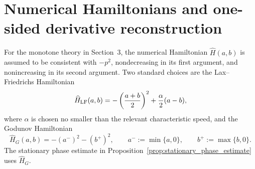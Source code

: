 \documentclass[11pt]{article}
\begin{document}
\appendix

\section{Numerical Hamiltonians and one-sided derivative reconstruction}\label{app:hamiltonian_weno}

For the monotone theory in Section~3, the numerical Hamiltonian \(\widehat H(a,b)\) is assumed to be consistent with \(-p^2\), nondecreasing in its first argument, and nonincreasing in its second argument.  Two standard choices are the Lax--Friedrichs Hamiltonian
\begin{equation}\label{eq:app_LF_H_new}
    \widehat H_{\rm LF}(a,b)
    =-\left(\frac{a+b}{2}\right)^2+\frac{\alpha}{2}(a-b),
\end{equation}
where \(\alpha\) is chosen no smaller than the relevant characteristic speed, and the Godunov Hamiltonian
\begin{equation}\label{eq:app_Godunov_H_new}
    \widehat H_G(a,b)=-(a^-)^2-(b^+)^2,
    \qquad
    a^-:=\min\{a,0\},
    \qquad
    b^+:=\max\{b,0\}.
\end{equation}
The stationary phase estimate in Proposition~\ref{prop:stationary_phase_estimate} uses \(\widehat H_G\).
\end{document}
